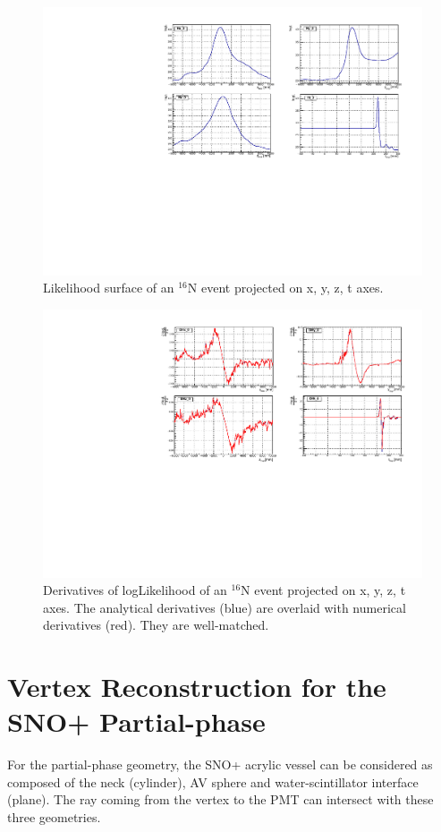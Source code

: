 \begin{figure}
	\centering
    \includegraphics[width=160mm]{logL_xyzt.pdf}
	\caption{Likelihood surface of an {$^{16}$}N event projected on x, y, z, t axes.}
	\label{logLxyz}
\end{figure}

\begin{figure}
	\centering
	\includegraphics[width=160mm]{derivativeLogL_xyzt.pdf}
	\caption{Derivatives of logLikelihood of an {$^{16}$}N event projected on x, y, z, t axes. The analytical derivatives (blue) are overlaid with numerical derivatives (red). They are well-matched.}
	\label{derivative_logLxyz}
\end{figure}


\section{Vertex Reconstruction for the SNO+ Partial-phase}
For the partial-phase geometry, the SNO+ acrylic vessel can be considered as composed of the neck (cylinder), AV sphere and water-scintillator interface (plane). The ray coming from the vertex to the PMT can intersect with these three geometries.

